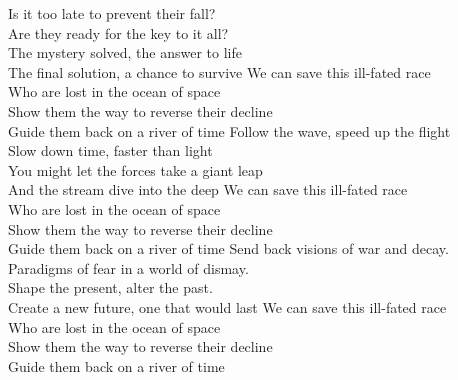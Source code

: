 Is it too late to prevent their fall?\\
Are they ready for the key to it all?\\
The mystery solved, the answer to life\\
The final solution, a chance to survive
\hops
{} We can save this ill-fated race\\
 Who are lost in the ocean of space\\
 Show them the way to reverse their decline\\
 Guide them back on a river of time
\hops
Follow the wave, speed up the flight\\
Slow down time, faster than light\\
You might let the forces take a giant leap\\
And the stream dive into the deep
\hops
We can save this ill-fated race\\
Who are lost in the ocean of space\\
Show them the way to reverse their decline\\
Guide them back on a river of time
\hops
Send back visions of war and decay.\\
Paradigms of fear in a world of dismay.\\
Shape the present, alter the past.\\
Create a new future, one that would last
\hops
{} We can save this ill-fated race\\
 Who are lost in the ocean of space\\
 Show them the way to reverse their decline\\
 Guide them back on a river of time